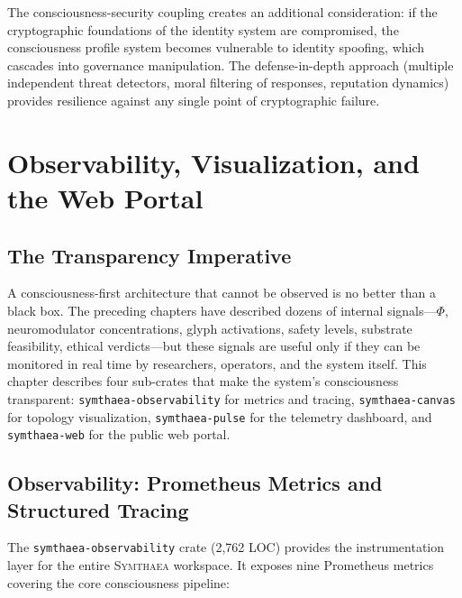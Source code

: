 \documentclass[12pt]{book}
\newcommand{\symthaea}{\textsc{Symthaea}}
\begin{document}
The consciousness-security coupling creates an additional consideration: if the cryptographic foundations of the identity system are compromised, the consciousness profile system becomes vulnerable to identity spoofing, which cascades into governance manipulation. The defense-in-depth approach (multiple independent threat detectors, moral filtering of responses, reputation dynamics) provides resilience against any single point of cryptographic failure.


\chapter{Observability, Visualization, and the Web Portal}
\label{ch:observability}

\section{The Transparency Imperative}

A consciousness-first architecture that cannot be observed is no better than a black box. The preceding chapters have described dozens of internal signals---$\Phi$, neuromodulator concentrations, glyph activations, safety levels, substrate feasibility, ethical verdicts---but these signals are useful only if they can be monitored in real time by researchers, operators, and the system itself. This chapter describes four sub-crates that make the system's consciousness transparent: \texttt{symthaea-observability} for metrics and tracing, \texttt{symthaea-canvas} for topology visualization, \texttt{symthaea-pulse} for the telemetry dashboard, and \texttt{symthaea-web} for the public web portal.

\section{Observability: Prometheus Metrics and Structured Tracing}

The \texttt{symthaea-observability} crate (2,762 LOC) provides the instrumentation layer for the entire \symthaea{} workspace. It exposes nine Prometheus metrics covering the core consciousness pipeline:
\end{document}
